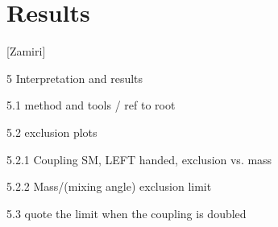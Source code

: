 \section{Results}\label{sec:results} 

[Zamiri]

5 Interpretation and results

5.1 method and tools / ref to root

5.2 exclusion plots

5.2.1 Coupling SM, LEFT handed, exclusion vs. mass

5.2.2 Mass/(mixing angle) exclusion limit

5.3 quote the limit when the coupling is doubled
